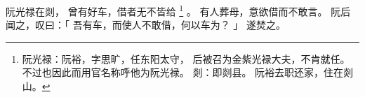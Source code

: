 
\switchcolumn*[\section{}]

阮光禄在剡，
曾有好车，借者无不皆给%
\footnote{%
    阮光禄：阮裕，字思旷，任东阳太守，
            后被召为金紫光禄大夫，不肯就任。
            不过也因此而用官名称呼他为阮光禄。
    剡：即剡县。
        阮裕去职还家，住在剡山。
}%
。
有人葬母，意欲借而不敢言。
阮后闻之，叹曰：「
    吾有车，而使人不敢借，何以车为？
」
遂焚之。

\switchcolumn



